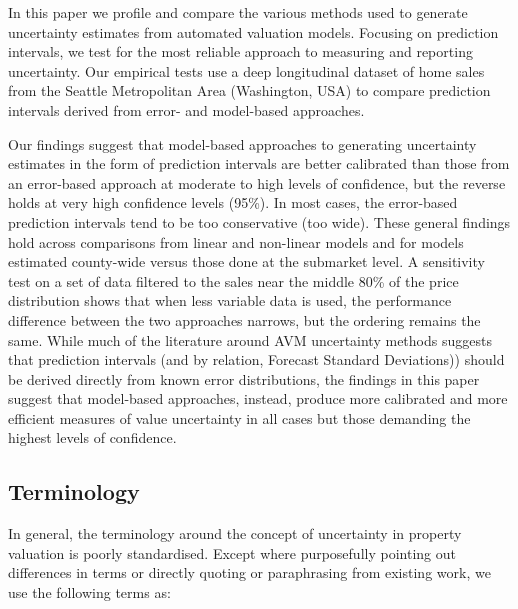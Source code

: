 \documentclass[colTwo]{anon}
\theoremstyle{definition}
\begin{document}
In this paper we profile and compare the various methods used to generate uncertainty estimates from automated valuation models. Focusing on prediction intervals, we test for the most reliable approach to measuring and reporting uncertainty.   Our empirical tests use a deep longitudinal dataset of home sales from the Seattle Metropolitan Area (Washington, USA) to compare prediction intervals derived from error- and model-based approaches.

Our findings suggest that model-based approaches to generating uncertainty estimates in the form of prediction intervals are better calibrated than those from an error-based approach at moderate to high levels of confidence, but the reverse holds at very high confidence levels (95\%). In most cases, the error-based prediction intervals tend to be too conservative (too wide).  These general findings hold across comparisons from linear and non-linear models and for models estimated county-wide versus those done at the submarket level. A sensitivity test on a set of data filtered to the sales near the middle 80\% of the price distribution shows that when less variable data is used, the performance difference between the two approaches narrows, but the ordering remains the same. While much of the literature around AVM uncertainty methods suggests that prediction intervals (and by relation, Forecast Standard Deviations)) should be derived directly from known error distributions, the findings in this paper suggest that model-based approaches, instead, produce more calibrated and more efficient measures of value uncertainty in all cases but those demanding the highest levels of confidence.

\subsection{Terminology}

In general, the terminology around the concept of uncertainty in property valuation is poorly standardised. Except where purposefully pointing out differences in terms or directly quoting or paraphrasing from existing work, we use the following terms as:
\end{document}
